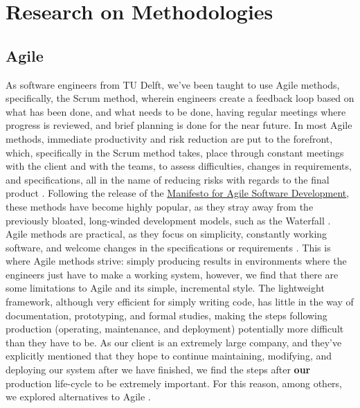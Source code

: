 \section{Research on Methodologies}
\subsection{Agile}
As software engineers from TU Delft, we've been taught to use Agile methods, specifically, the Scrum method, wherein engineers create a feedback loop based on what has been done, and what needs to be done, having regular meetings where progress is reviewed, and brief planning is done for the near future. In most Agile methods, immediate productivity and risk reduction are put to the forefront, which, specifically in the Scrum method takes, place through constant meetings with the client and with the teams, to assess difficulties, changes in requirements, and specifications, all in the name of reducing risks with regards to the final product \cite{agilesource}. Following the release of the \href{https://agilemanifesto.org/}{Manifesto for Agile Software Development}, these methods have become highly popular, as they stray away from the previously bloated, long-winded development models, such as the Waterfall \cite{manifest}. Agile methods are practical, as they focus on simplicity, constantly working software, and welcome changes in the specifications or requirements \cite{beck2001agile}. This is where Agile methods strive: simply producing results in environments where the engineers just have to make a working system, however, we find that there are some limitations to Agile and its simple, incremental style. The lightweight framework, although very efficient for simply writing code, has little in the way of documentation, prototyping, and formal studies, making the steps following production (operating, maintenance, and deployment) potentially more difficult than they have to be. As our client is an extremely large company, and they've explicitly mentioned that they hope to continue maintaining, modifying, and deploying our system after we have finished, we find the steps after \textbf{our} production life-cycle to be extremely important. For this reason, among others, we explored alternatives to Agile \cite{relation}.

